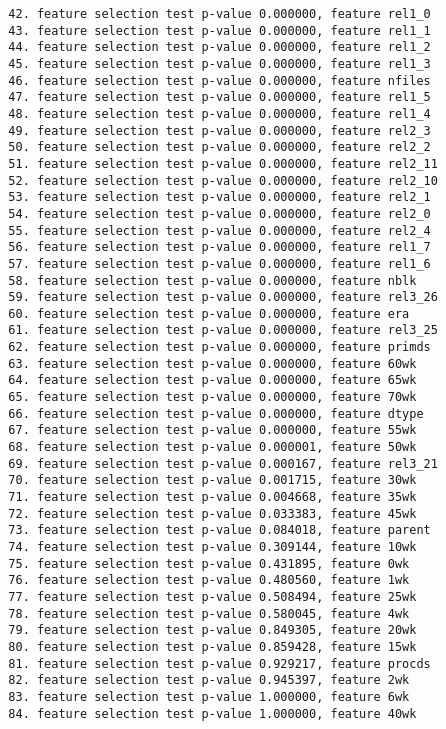 \begin{verbatim}
  42. feature selection test p-value 0.000000, feature rel1_0
  43. feature selection test p-value 0.000000, feature rel1_1
  44. feature selection test p-value 0.000000, feature rel1_2
  45. feature selection test p-value 0.000000, feature rel1_3
  46. feature selection test p-value 0.000000, feature nfiles
  47. feature selection test p-value 0.000000, feature rel1_5
  48. feature selection test p-value 0.000000, feature rel1_4
  49. feature selection test p-value 0.000000, feature rel2_3
  50. feature selection test p-value 0.000000, feature rel2_2
  51. feature selection test p-value 0.000000, feature rel2_11
  52. feature selection test p-value 0.000000, feature rel2_10
  53. feature selection test p-value 0.000000, feature rel2_1
  54. feature selection test p-value 0.000000, feature rel2_0
  55. feature selection test p-value 0.000000, feature rel2_4
  56. feature selection test p-value 0.000000, feature rel1_7
  57. feature selection test p-value 0.000000, feature rel1_6
  58. feature selection test p-value 0.000000, feature nblk
  59. feature selection test p-value 0.000000, feature rel3_26
  60. feature selection test p-value 0.000000, feature era
  61. feature selection test p-value 0.000000, feature rel3_25
  62. feature selection test p-value 0.000000, feature primds
  63. feature selection test p-value 0.000000, feature 60wk
  64. feature selection test p-value 0.000000, feature 65wk
  65. feature selection test p-value 0.000000, feature 70wk
  66. feature selection test p-value 0.000000, feature dtype
  67. feature selection test p-value 0.000000, feature 55wk
  68. feature selection test p-value 0.000001, feature 50wk
  69. feature selection test p-value 0.000167, feature rel3_21
  70. feature selection test p-value 0.001715, feature 30wk
  71. feature selection test p-value 0.004668, feature 35wk
  72. feature selection test p-value 0.033383, feature 45wk
  73. feature selection test p-value 0.084018, feature parent
  74. feature selection test p-value 0.309144, feature 10wk
  75. feature selection test p-value 0.431895, feature 0wk
  76. feature selection test p-value 0.480560, feature 1wk
  77. feature selection test p-value 0.508494, feature 25wk
  78. feature selection test p-value 0.580045, feature 4wk
  79. feature selection test p-value 0.849305, feature 20wk
  80. feature selection test p-value 0.859428, feature 15wk
  81. feature selection test p-value 0.929217, feature procds
  82. feature selection test p-value 0.945397, feature 2wk
  83. feature selection test p-value 1.000000, feature 6wk
  84. feature selection test p-value 1.000000, feature 40wk

\end{verbatim}

